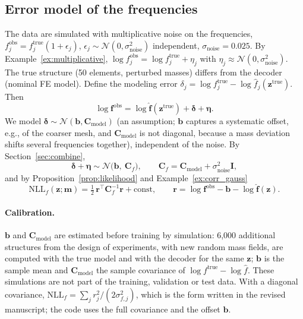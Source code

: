 \documentclass[11pt,a4paper]{article}
\numberwithin{equation}{section}
\theoremstyle{plain}
\theoremstyle{definition}
\theoremstyle{remark}
\newcommand{\m}{\mathbf{m}}
\newcommand{\z}{\mathbf{z}}
\newcommand{\rr}{\mathbf{r}}
\newcommand{\bb}{\mathbf{b}}
\newcommand{\Cb}{\mathbf{C}}
\newcommand{\I}{\mathbf{I}}
\newcommand{\NLL}{\mathrm{NLL}}
\newcommand{\N}{\mathcal{N}}
\begin{document}
\subsection{Error model of the frequencies}
\label{sec:freq_error}
The data are simulated with multiplicative noise on the frequencies, $f^{\text{obs}}_j=f^{\text{true}}_j(1+\epsilon_j)$, $\epsilon_j\sim\N(0,\sigma_{\text{noise}}^2)$ independent, $\sigma_{\text{noise}}=0.025$. By Example~\ref{ex:multiplicative}, $\log f^{\text{obs}}_j=\log f^{\text{true}}_j+\eta_j$ with $\eta_j\approx\N(0,\sigma_{\text{noise}}^2)$.
The true structure (50 elements, perturbed masses) differs from the decoder (nominal FE model). Define the modeling error $\delta_j=\log f^{\text{true}}_j-\log\hat f_j(\z^{\text{true}})$. Then
\begin{equation*}
\log\mathbf f^{\text{obs}}=\log\hat{\mathbf f}(\z^{\text{true}})+\bm\delta+\bm\eta.
\end{equation*}
We model $\bm\delta\sim\N(\bb,\Cb_{\text{model}})$ (an assumption; $\bb$ captures a systematic offset, e.g., of the coarser mesh, and $\Cb_{\text{model}}$ is not diagonal, because a mass deviation shifts several frequencies together), independent of the noise. By Section~\ref{sec:combine},
\begin{equation}
\bm\delta+\bm\eta\sim\N\big(\bb,\ \Cb_f\big),\qquad \Cb_f=\Cb_{\text{model}}+\sigma_{\text{noise}}^2\I,
\end{equation}
and by Proposition~\ref{prop:likelihood} and Example~\ref{ex:corr_gauss}
\begin{equation}
\NLL_f(\z;\m)=\tfrac12\,\rr^\top\Cb_f^{-1}\rr+\text{const},\qquad \rr=\log\mathbf f^{\text{obs}}-\bb-\log\hat{\mathbf f}(\z).
\end{equation}
\paragraph{Calibration.} $\bb$ and $\Cb_{\text{model}}$ are estimated before training by simulation: 6,000 additional structures from the design of experiments, with new random mass fields, are computed with the true model and with the decoder for the same $\z$; $\bb$ is the sample mean and $\Cb_{\text{model}}$ the sample covariance of $\log f^{\text{true}}-\log\hat f$. These simulations are not part of the training, validation or test data. With a diagonal covariance, $\NLL_f=\sum_jr_j^2/(2\sigma_{f,j}^2)$, which is the form written in the revised manuscript; the code uses the full covariance and the offset $\bb$.
\end{document}
